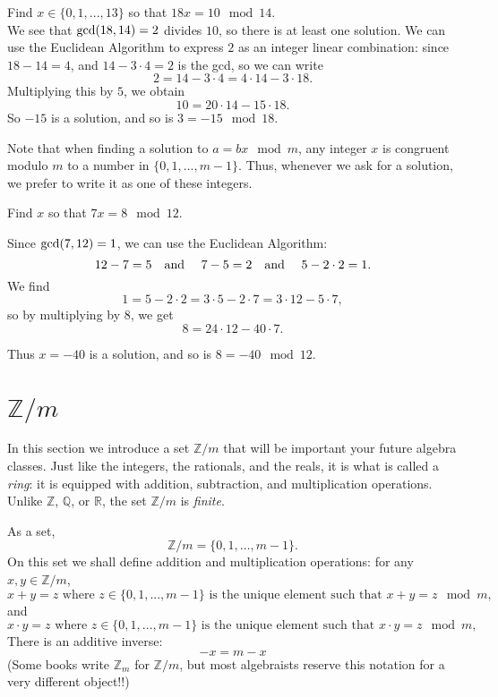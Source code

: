 \documentclass[11pt,dvipsnames]{book}
\def\gcd{{\rm gcd}}
\numberwithin{equation}{section} %
\numberwithin{figure}{section} %
\numberwithin{table}{section} %
\begin{document}
\begin{example}
Find $x\in \{0,1,...,13\}$ so that $18x = 10\mod 14$. \\

We see that $\gcd(18,14)=2$ divides $10$, so there is at least one solution.
We can use the Euclidean Algorithm to express $2$ as an integer linear combination:
since $18 - 14 = 4$, and $14 - 3\cdot 4 = 2$ is the gcd, so we can write
\[
2 = 14 - 3\cdot 4 = 4\cdot 14 - 3 \cdot 18.
\]
Multiplying this by $5$, we obtain
\[
10 = 20\cdot 14 - 15 \cdot 18.
\]
So $-15$ is a solution, and so is $3 = -15 \mod 18$.
\end{example}

Note that when finding a solution to $a = bx\mod m$, any integer $x$ is congruent modulo $m$ to a number in $\{0,1,...,m-1\}$. Thus, whenever we ask for a solution, we prefer to write it as one of these integers.

\begin{exercise}
Find $x$ so that $7x = 8\mod 12$. \\
\begin{solution}
Since $\gcd(7,12)=1$, we can use the Euclidean Algorithm:
\[
12-7 = 5 \text{\quad and \quad} 7-5 = 2 \text{\quad and \quad} 5-2\cdot 2 = 1.
\]
We find
\[
1 = 5 - 2\cdot 2 = 3\cdot 5 - 2\cdot 7 = 3\cdot 12 - 5\cdot 7,
\]
so by multiplying by $8$, we get
\[
8 = 24 \cdot 12 - 40 \cdot 7.
\]

Thus $x = -40$ is a solution, and so is $8 = -40 \mod 12$. 
\end{solution}
\end{exercise}

\section{$\mathbb{Z}/m$}
 
In this section we introduce a set $\mathbb{Z}/m$ that will be important your future algebra classes.
Just like the integers, the rationals, and the reals, it is what is called a \emph{ring}: it is equipped with addition, subtraction, and multiplication operations.
Unlike $\mathbb{Z}$, $\mathbb{Q}$, or $\mathbb{R}$, the set $\mathbb{Z}/m$ is {\it finite}.

As a set,
\[
\mathbb{Z}/m=\{0,1,\dots,m-1\}. 
\]
On this set we shall define addition and multiplication operations: for any $x,y \in \mathbb{Z}/m$,
\[
x + y = z \mbox{ where $z\in \{0,1,...,m-1\}$ is the unique element such that } x + y = z\mod m,
\] 
and
\[
x \cdot y = z \mbox{ where $z\in \{0,1,...,m-1\}$ is the unique element such that } x \cdot y = z\mod m,
\]
There is an additive inverse:
\[
- x = m-x
\]
(Some books write $\mathbb{Z}_m$ for $\mathbb{Z}/m$, but most algebraists reserve this notation for a very different object!!)
\end{document}
